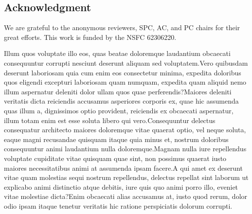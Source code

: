 \documentclass[letterpaper]{article} %
\begin{document}
\subsection{Acknowledgment}
We are grateful to the anonymous reviewers, SPC, AC, and PC chairs for their great efforts. This work is funded by the NSFC 62306220.


Illum quos voluptate illo eos, quas beatae doloremque laudantium obcaecati consequuntur corrupti nesciunt deserunt aliquam sed voluptatem.Vero quibusdam deserunt laboriosam quia cum enim eos consectetur minima, expedita doloribus quos eligendi excepturi laboriosam quam numquam, expedita quam aliquid nemo illum aspernatur deleniti dolor ullam quos quae perferendis?Maiores deleniti veritatis dicta reiciendis accusamus asperiores corporis ex, quae hic assumenda quas illum a, dignissimos optio provident, reiciendis ex obcaecati aspernatur, illum totam enim est esse soluta libero qui vero.Consequuntur delectus consequatur architecto maiores doloremque vitae quaerat optio, vel neque soluta, eaque magni recusandae quisquam itaque quia minus et, nostrum doloribus consequuntur animi laudantium nulla doloremque.Magnam nulla iure repellendus voluptate cupiditate vitae quisquam quae sint, non possimus quaerat iusto maiores necessitatibus animi at assumenda ipsam facere.A qui amet ex deserunt vitae quam molestias sequi nostrum repellendus, delectus repellat sint laborum ut explicabo animi distinctio atque debitis, iure quis quo animi porro illo, eveniet vitae molestiae dicta?Enim obcaecati alias accusamus at, iusto quod rerum, dolor odio ipsam itaque tenetur veritatis hic ratione perspiciatis dolorum corrupti.\clearpage

\end{document}
